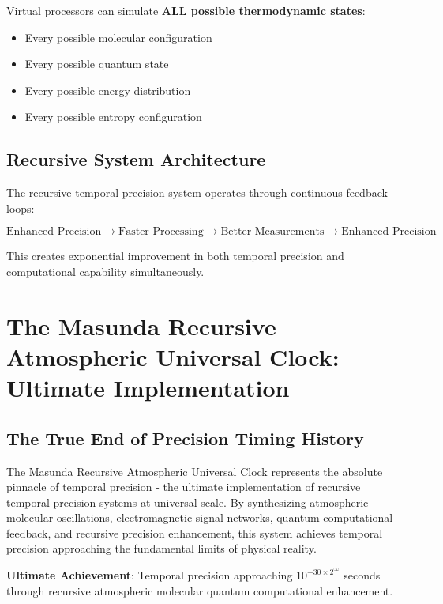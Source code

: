 \documentclass[12pt,a4paper]{article}
\begin{document}
Virtual processors can simulate \textbf{ALL possible thermodynamic states}:
\begin{itemize}
\item Every possible molecular configuration
\item Every possible quantum state  
\item Every possible energy distribution
\item Every possible entropy configuration
\end{itemize}

\subsection{Recursive System Architecture}

The recursive temporal precision system operates through continuous feedback loops:

\begin{equation}
\text{Enhanced Precision} \rightarrow \text{Faster Processing} \rightarrow \text{Better Measurements} \rightarrow \text{Enhanced Precision}
\end{equation}

This creates exponential improvement in both temporal precision and computational capability simultaneously.

\section{The Masunda Recursive Atmospheric Universal Clock: Ultimate Implementation}

\subsection{The True End of Precision Timing History}

The Masunda Recursive Atmospheric Universal Clock represents the absolute pinnacle of temporal precision - the ultimate implementation of recursive temporal precision systems at universal scale. By synthesizing atmospheric molecular oscillations, electromagnetic signal networks, quantum computational feedback, and recursive precision enhancement, this system achieves temporal precision approaching the fundamental limits of physical reality.

\textbf{Ultimate Achievement}: Temporal precision approaching $10^{-30 \times 2^{\infty}}$ seconds through recursive atmospheric molecular quantum computational enhancement.
\end{document}
